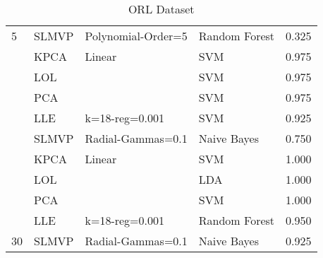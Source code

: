 \begin{table}
\begin{tabular}{llllr}
        \multirow{-5}{*}{5}                      & SLMVP          & Polynomial-Order=5 & Random Forest & 0.325    \\
        \rowcolor{lightgray}                     & KPCA           & Linear             & SVM           & 0.975    \\
        \rowcolor{lightgray}                     & LOL            &                    & SVM           & 0.975    \\
        \rowcolor{lightgray}                     & PCA            &                    & SVM           & 0.975    \\
        \rowcolor{lightgray}                     & LLE            & k=18-reg=0.001     & SVM           & 0.925    \\
        \rowcolor{lightgray}\multirow{-5}{*}{15} & SLMVP          & Radial-Gammas=0.1  & Naive Bayes   & 0.750    \\
                                                 & KPCA           & Linear             & SVM           & 1.000    \\
                                                 & LOL            &                    & LDA           & 1.000    \\
                                                 & PCA            &                    & SVM           & 1.000    \\
                                                 & LLE            & k=18-reg=0.001     & Random Forest & 0.950    \\
        \multirow{-5}{*}{30}                     & SLMVP          & Radial-Gammas=0.1  & Naive Bayes   & 0.925    \\
        \bottomrule
    \end{tabular}
    \caption{ORL Dataset}
    \label{annex-tab:orl-dataset}
\end{table}

